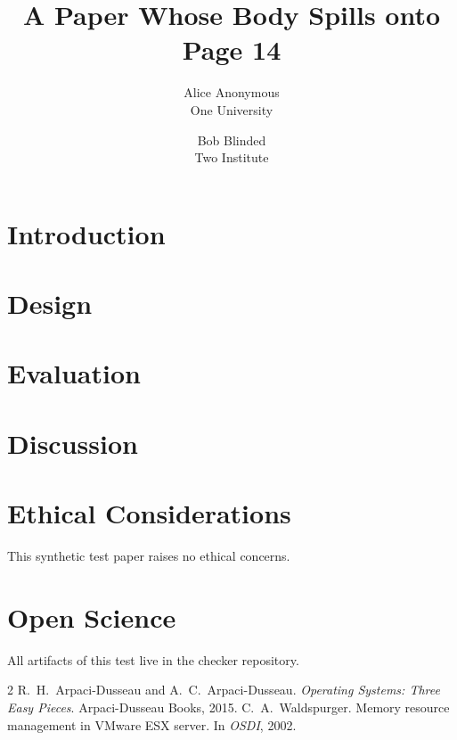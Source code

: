 \documentclass[letterpaper,twocolumn,10pt]{article}
\date{}
\title{\Large \bf A Paper Whose Body Spills onto Page 14}
\author{{\rm Alice Anonymous}\\One University \and {\rm Bob Blinded}\\Two Institute}
\begin{document}
\maketitle

\begin{abstract}
\lipsum[1][1-5]
\end{abstract}

\section{Introduction}
\lipsum[1-32]

\section{Design}
\lipsum[33-64]

\section{Evaluation}
\lipsum[65-96]

\section{Discussion}
\lipsum[97-128]

\appendix
\section*{Ethical Considerations}
This synthetic test paper raises no ethical concerns.

\section*{Open Science}
All artifacts of this test live in the checker repository.

\begin{thebibliography}{2}
 R.~H.\ Arpaci-Dusseau and A.~C.\ Arpaci-Dusseau.
  \emph{Operating Systems: Three Easy Pieces}. Arpaci-Dusseau Books, 2015.
 C.~A.\ Waldspurger. Memory resource management in VMware ESX
  server. In \emph{OSDI}, 2002.
\end{thebibliography}
\end{document}
